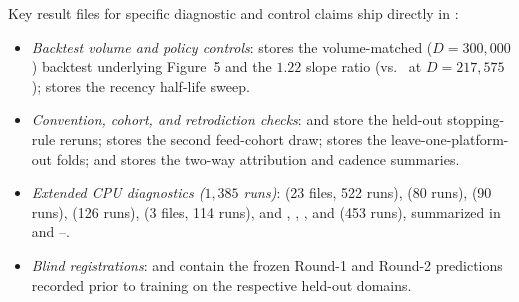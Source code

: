 \documentclass[10pt,letterpaper]{article}
\begin{document}
\begin{sloppypar}
\noindent
Key result files for specific diagnostic and control claims ship directly in :
\begin{itemize}
\item \emph{Backtest volume and policy controls}:  stores the volume-matched ($D = 300{,}000$) backtest underlying Figure~5 and the $1.22$ slope ratio (vs.\  at $D = 217{,}575$);  stores the recency half-life sweep.
\item \emph{Convention, cohort, and retrodiction checks}:  and  store the held-out stopping-rule reruns;  stores the second feed-cohort draw;  stores the leave-one-platform-out folds; and  stores the two-way attribution and cadence summaries.
\item \emph{Extended CPU diagnostics ($1{,}385$ runs)}:  (23 files, 522 runs),  (80 runs),  (90 runs),  (126 runs),  (3 files, 114 runs), and , , , and  (453 runs), summarized in  and --.
\item \emph{Blind registrations}:  and  contain the frozen Round-1 and Round-2 predictions recorded prior to training on the respective held-out domains.
\end{itemize}
\end{sloppypar}
\end{document}
